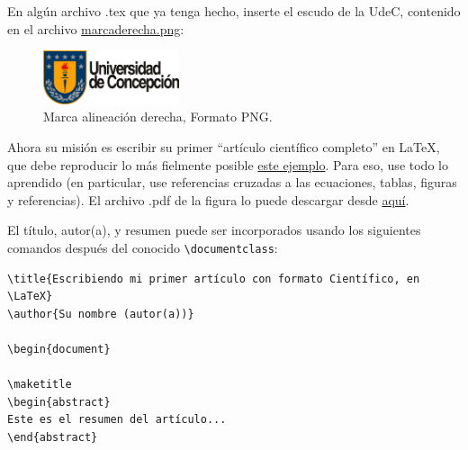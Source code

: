 \documentclass[11pt]{exam}
\begin{document}
\begin{questions}
\item En algún archivo .tex que ya tenga hecho, inserte el escudo de la UdeC, contenido en el archivo 
\href{https://educacion.udec.cl/wp-content/uploads/2024/03/marcaderecha.png}{marcaderecha.png}:
\begin{figure}[h!]
\begin{center}
\includegraphics[width=4cm]{marcaderecha.png}
\end{center}
\caption{Marca alineación derecha, Formato PNG.}
\label{fig:escudo}
\end{figure}


\item Ahora su misión es escribir su primer ``artículo científico completo'' en \LaTeX, que debe reproducir lo más fielmente posible \href{https://github.com/gfrubi/CC/blob/master/guias/07/ejemplo-articulo.pdf}{este ejemplo}. Para eso, use todo lo aprendido (en particular, use referencias cruzadas a las ecuaciones, tablas, figuras y referencias). El archivo .pdf de la figura lo puede descargar desde \href{https://github.com/gfrubi/CC/blob/master/guias/07/fig-ajuste-lineal.pdf}{aquí}.

El título, autor(a), y resumen puede ser incorporados usando los siguientes comandos después del conocido \verb|\documentclass|:

\begin{verbatim}
\title{Escribiendo mi primer artículo con formato Científico, en \LaTeX}
\author{Su nombre (autor(a))}

\begin{document}

\maketitle
\begin{abstract}
Este es el resumen del artículo...
\end{abstract}
\end{verbatim}


\end{questions}
\end{document}
